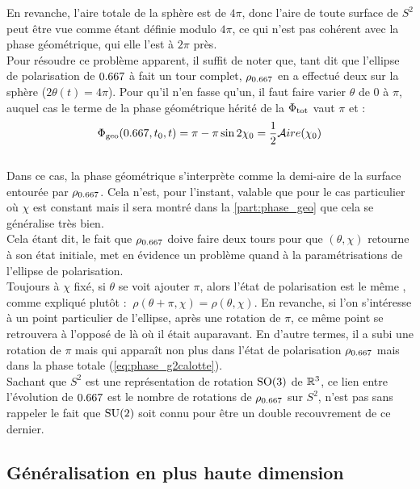En revanche, l'aire totale de la sphère est de $4\pi$, donc l'aire de toute surface de $S^2$ peut être vue comme étant définie modulo $4\pi$, ce qui n'est pas cohérent avec la phase géométrique, qui elle l'est à $2\pi$ près.
\\
Pour résoudre ce problème apparent, il suffit de noter que, tant dit que l’ellipse de polarisation de $\x$ à fait un tour complet, 
$\rho_{\x}$ en a effectué deux sur la sphère ($2\theta(t) = 4\pi$).
Pour qu'il n'en fasse qu'un, il faut faire varier $\theta$ de 0 à $\pi$, auquel cas le terme de la phase géométrique hérité de la $\Phi_{\text{\normalfont tot}}$ vaut $\pi$ et :
\begin{equation} \label{eq:phase_g2calotte}
	\phaseg(\x, t_0, t) = \pi - \pi\sin 2\chi_0 = \frac{1}{2}\mathcal{A}ire(\chi_0)
\end{equation}
\\
Dans ce cas, la phase géométrique s'interprète comme la demi-aire de la surface entourée par $\rho_{\x}$. Cela n'est, pour l'instant, valable que pour le cas particulier où $\chi$ est constant mais il sera montré dans la \cref{part:phase_geo} que cela se généralise très bien.
\\

Cela étant dit, le fait que $\rho_{\x}$ doive faire deux tours pour que $(\theta,\chi)$ retourne à son état initiale, met en évidence un problème quand à la paramétrisations de l'ellipse de polarisation.
\\
Toujours à $\chi$ fixé, si $\theta$ se voit ajouter $\pi$, alors l'état de polarisation est le même , comme expliqué plutôt : $\ \rho(\theta+\pi,\chi) = \rho(\theta, \chi)$.
En revanche, si l'on s'intéresse à un point particulier de l'ellipse, après une rotation de $\pi$, ce même point se retrouvera à l'opposé de là où il était auparavant. 
En d'autre termes, il a subi une rotation de $\pi$ mais qui apparaît non plus dans l'état de polarisation $\rho_{\x}$ mais dans la phase totale (\cref{eq:phase_g2calotte}).
\\
Sachant que $S^2$ est une représentation de rotation $\text{\normalfont SO}(3)$ de $\mathbb{R}^3$, ce lien entre l'évolution de $\x$ est le nombre de rotations de $\rho_{\x}$ sur $S^2$, n'est pas sans rappeler le fait que $\text{\normalfont SU}(2)$ soit connu pour être un double recouvrement de ce dernier.
\\




\subsection{\todo Généralisation en plus haute dimension} \label{subsec:aller_plus_loin}

